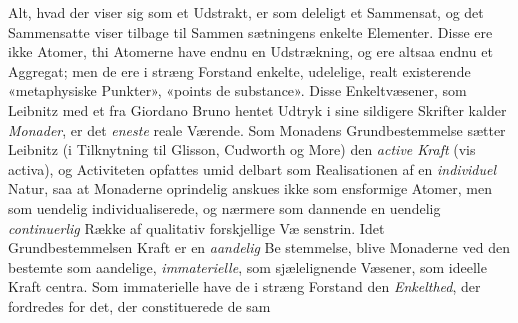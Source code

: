 \documentclass[12pt,a4paper]{book}
\begin{document}
Alt, hvad der viser sig som et Udstrakt, er som deleligt
et Sammensat, og det Sammensatte viser tilbage til Sammen\-%
sætningens enkelte Elementer. Disse ere ikke Atomer, thi
Atomerne have endnu en Udstrækning, og ere altsaa endnu
et Aggregat; men de ere i stræng Forstand enkelte, udelelige,
realt existerende «metaphysiske Punkter», «points de substance».
Disse Enkeltvæsener, som Leibnitz med et fra Giordano Bruno
hentet Udtryk i sine sildigere Skrifter kalder \emph{Monader}, er
det \emph{eneste} reale Værende. Som Monadens Grundbestemmelse
sætter Leibnitz (i Tilknytning til Glisson, Cudworth og More)
den \emph{active Kraft} (vis activa), og Activiteten opfattes umid\-%
delbart som Realisationen af en \emph{individuel} Natur, saa at
Monaderne oprindelig anskues ikke som ensformige Atomer,
men som uendelig individualiserede, og nærmere som dannende
en uendelig \emph{continuerlig} Række af qualitativ forskjellige Væ\-%
senstrin. Idet Grundbestemmelsen Kraft er en \emph{aandelig} Be\-%
stemmelse, blive Monaderne ved den bestemte som aandelige,
\emph{immaterielle}, som sjælelignende Væsener, som ideelle Kraft\-%
centra. Som immaterielle have de i stræng Forstand den
\emph{Enkelthed}, der fordredes for det, der constituerede de sam\-%
\end{document}
